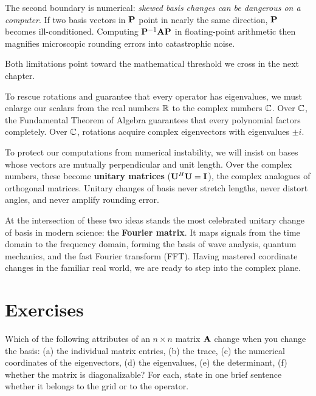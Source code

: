 The second boundary is numerical: \emph{skewed basis changes can be dangerous on a computer}. If two basis vectors in $\mathbf{P}$ point in nearly the same direction, $\mathbf{P}$ becomes ill-conditioned. Computing $\mathbf{P}^{-1}\mathbf{A}\mathbf{P}$ in floating-point arithmetic then magnifies microscopic rounding errors into catastrophic noise.

Both limitations point toward the mathematical threshold we cross in the next chapter.

To rescue rotations and guarantee that every operator has eigenvalues, we must enlarge our scalars from the real numbers $\mathbb{R}$ to the complex numbers $\mathbb{C}$. Over $\mathbb{C}$, the Fundamental Theorem of Algebra guarantees that every polynomial factors completely. Over $\mathbb{C}$, rotations acquire complex eigenvectors with eigenvalues $\pm i$.

To protect our computations from numerical instability, we will insist on bases whose vectors are mutually perpendicular and unit length. Over the complex numbers, these become \textbf{unitary matrices} ($\mathbf{U}^H\mathbf{U} = \mathbf{I}$), the complex analogues of orthogonal matrices. Unitary changes of basis never stretch lengths, never distort angles, and never amplify rounding error.

At the intersection of these two ideas stands the most celebrated unitary change of basis in modern science: the \textbf{Fourier matrix}. It maps signals from the time domain to the frequency domain, forming the basis of wave analysis, quantum mechanics, and the fast Fourier transform (FFT). Having mastered coordinate changes in the familiar real world, we are ready to step into the complex plane.

\section*{Exercises}

\begin{exercise}
\label{ch31:ex-quick-check}
Which of the following attributes of an $n\times n$ matrix $\mathbf{A}$ change when you change the basis:
(a) the individual matrix entries,
(b) the trace,
(c) the numerical coordinates of the eigenvectors,
(d) the eigenvalues,
(e) the determinant,
(f) whether the matrix is diagonalizable?
For each, state in one brief sentence whether it belongs to the grid or to the operator.
\end{exercise}

